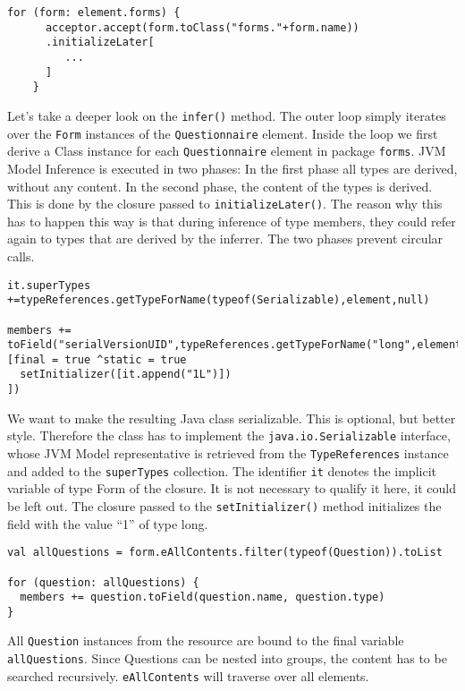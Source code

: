\begin{lstlisting}[language=Xtend]
    for (form: element.forms) {
      acceptor.accept(form.toClass("forms."+form.name))
      .initializeLater[
         ...
      ]
    }
\end{lstlisting}

Let's take a deeper look on the \texttt{infer()} method. The outer loop simply
iterates over the \texttt{Form} instances of the \texttt{Questionnaire} element.
Inside the loop we first derive a Class instance for each \texttt{Questionnaire}
element in package \texttt{forms}. JVM Model Inference is executed in two
phases: In the first phase all types are derived, without any content. In the
second phase, the content of the types is derived. This is done by the closure
passed to \texttt{initializeLater()}. The reason why this has to happen this way
is that during inference of type members, they could refer again to types that
are derived by the inferrer. The two phases prevent circular calls.

\begin{lstlisting}[language=Xtend]
it.superTypes +=typeReferences.getTypeForName(typeof(Serializable),element,null)

members += toField("serialVersionUID",typeReferences.getTypeForName("long",element),
[final = true ^static = true 
  setInitializer([it.append("1L")])
])
\end{lstlisting}
        
We want to make the resulting Java class serializable. This is optional, but
better style. Therefore the class has to implement the \texttt{java.io.Serializable}
interface, whose JVM Model representative is retrieved from the \texttt{TypeReferences}
instance and added to the \texttt{superTypes} collection. The identifier \texttt{it} denotes the
implicit variable of type Form of the closure. It is not necessary to qualify it
here, it could be left out. The closure passed to the \texttt{setInitializer()}
method initializes the field with the value ``1'' of type long.

\begin{lstlisting}[language=Xtend]
val allQuestions = form.eAllContents.filter(typeof(Question)).toList

for (question: allQuestions) {
  members += question.toField(question.name, question.type)
}
\end{lstlisting}

All \texttt{Question} instances from the resource are bound to the final variable
\texttt{allQuestions}. Since Questions can be nested into groups, the content has to be
searched recursively. \texttt{eAllContents} will traverse over all elements.

